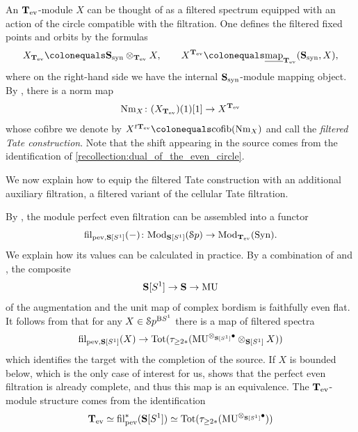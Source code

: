 \documentclass[oneside,a4paper]{amsart}
\begin{document}
\begin{recollection}
An $\mathbf{T}_{\mathrm{ev}}$-module $X$ can be thought of as a filtered spectrum equipped with an action of the circle compatible with the filtration. One defines the filtered fixed points and orbits by the formulas 
\[
X_{\evencircle} \colonequals \synsphere \otimes_{\evencircle} X, \qquad
X^{\evencircle} \colonequals \underline{\map}_{\evencircle}(\synsphere, X),
\]
where on the right-hand side we have the internal $\mathbf{S}_{\mathrm{syn}}$-module mapping object. By \cite[{Construction 2.58}]{antieau2024cyclotomic}, there is a norm map 
\[
\mathrm{Nm}_{X} \colon (X_{\mathbf{T}_{\mathrm{ev}}})(1)[1] \rightarrow X^{\mathbf{T}_{\mathrm{ev}}} 
\]
whose cofibre we denote by $X^{t \evencircle} \colonequals \mathrm{cofib}(\mathrm{Nm}_{X})$ and call the \emph{filtered Tate construction}. Note that the shift appearing in the source comes from the identification of \cref{recollection:dual_of_the_even_circle}. 
\end{recollection}

We now explain how to equip the filtered Tate construction with an additional auxiliary filtration, a filtered variant of the cellular Tate filtration. 

\begin{recollection}
\label{recollection:equivariant_perfect_even_filtration}
By \cite[{Theorem 3.37}]{pstrkagowski2025perfect}, the module perfect even filtration can be assembled into a functor 
\[
\operatorname{fil}_{\mathrm{pev}, \mathbf{S}[S^{1}]}(-) \colon \mathrm{Mod}_{\mathbf{S}[S^{1}]}(\EuScript{S}p) \rightarrow \mathrm{Mod}_{\mathbf{T}_{\mathrm{ev}}}(\mathrm{Syn}). 
\]
We explain how its values can be calculated in practice. By a combination of \cite[{Corollary 2.36}]{antieau2024cyclotomic} and \cite[{Proposition 2.2.20}]{hahnmotivic}, the composite 
\[
\mathbf{S}[S^{1}] \rightarrow \mathbf{S} \rightarrow \mathrm{MU}
\]
of the augmentation and the unit map of complex bordism is faithfully even flat. It follows from \cite[{Theorem 6.26}]{pstrkagowski2025perfect} that for any $X \in \EuScript{S}p^{\mathrm{B}S^{1}}$ there is a map of filtered spectra
\[
\operatorname{fil}_{\mathrm{pev}, \mathbf{S}[S^{1}]}(X) \rightarrow \mathrm{Tot}(\tau_{\geq 2 \ast}(\mathrm{MU}^{\otimes_{\mathbf{S}[S^{1}]} \bullet} \otimes_{\mathbf{S}[S^{1}]} X)) 
\]
which identifies the target with the completion of the source. If $X$ is bounded below, which is the only case of interest for us, \cite[Theorem 8.3]{pstrkagowski2025perfect} shows that the perfect even filtration is already complete, and thus this map is an equivalence. The $\mathbf{T}_{\mathrm{ev}}$-module structure comes from the identification 
\[
\mathbf{T}_{\mathrm{ev}} \simeq \operatorname{fil}^{\ast}_{\mathrm{pev}}(\mathbf{S}[S^{1}]) \simeq \mathrm{Tot}(\tau_{\geq 2 \ast}(\mathrm{MU}^{\otimes_{\mathbf{S}[S^{1}]} \bullet}))
\]
\end{recollection}
\end{document}
